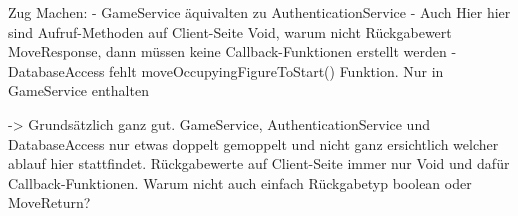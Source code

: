 Zug Machen:
- GameService äquivalten zu AuthenticationService
- Auch Hier hier sind Aufruf-Methoden auf Client-Seite Void, warum nicht Rückgabewert MoveResponse, dann müssen keine Callback-Funktionen erstellt werden
- DatabaseAccess fehlt moveOccupyingFigureToStart() Funktion. Nur in GameService enthalten

-> Grundsätzlich ganz gut. GameService, AuthenticationService und DatabaseAccess nur etwas doppelt gemoppelt und nicht ganz ersichtlich welcher ablauf hier 
stattfindet. Rückgabewerte auf Client-Seite immer nur Void und dafür Callback-Funktionen. Warum nicht auch einfach Rückgabetyp boolean oder MoveReturn?


